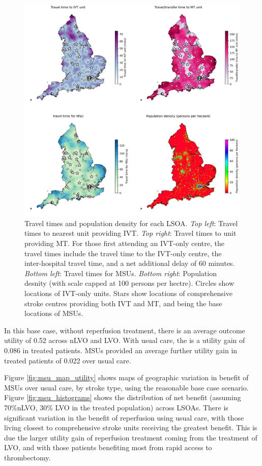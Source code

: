 \begin{figure}[h!]
    \centering
    \includegraphics[width=1.0\linewidth]{images/map_times.jpg}
    \caption{Travel times and population density for each LSOA. \textit{Top left}: Travel times to nearest unit providing IVT. \textit{Top right}: Travel times to unit providing MT. For those first attending an IVT-only centre, the travel times include the travel time to the IVT-only centre, the inter-hospital travel time, and a net additional delay of 60 minutes. \textit{Bottom left}: Travel times for MSUs. \textit{Bottom right}: Population desnity (with scale capped at 100 persons per hectre). Circles show locations of IVT-only units. Stars show locations of comprehensive stroke centres providing both IVT and MT, and being the base locations of MSUs.}
    \label{fig:map_times}
\end{figure}


In this base case, without reperfusion treatment, there is an average outcome utility of 0.52 across nLVO and LVO. With usual care, the is a utility gain of 0.086 in treated patients. MSUs provided an average further utility gain in treated patients of 0.022 over usual care.

Figure \ref{fig:msu_map_utility} shows maps of geographic variation in benefit of MSUs over usual care, by stroke type, using the reasonable base case scenario. Figure \ref{fig:msu_histograms} shows the distribution of net benefit (assuming 70\%nLVO, 30\% LVO in the treated population) across LSOAs. There is significant variation in the benefit of reperfusion using usual care, with those living closest to comprehensive stroke units receiving the greatest benefit. This is due the larger utility gain of reperfusion treatment coming from the treatment of LVO, and with those patients benefiting most from rapid access to thrombectomy.


